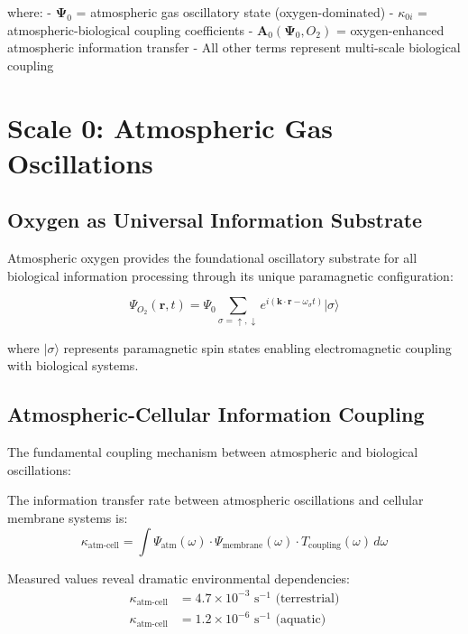 \documentclass[twocolumn]{article}
\begin{document}
where:
- $\mathbf{\Psi}_0$ = atmospheric gas oscillatory state (oxygen-dominated)
- $\kappa_{0i}$ = atmospheric-biological coupling coefficients
- $\mathbf{A}_0(\mathbf{\Psi}_0, O_2)$ = oxygen-enhanced atmospheric information transfer
- All other terms represent multi-scale biological coupling

\section{Scale 0: Atmospheric Gas Oscillations}

\subsection{Oxygen as Universal Information Substrate}

Atmospheric oxygen provides the foundational oscillatory substrate for all biological information processing through its unique paramagnetic configuration:

\begin{equation}
\Psi_{O_2}(\mathbf{r}, t) = \Psi_0 \sum_{\sigma=\uparrow,\downarrow} e^{i(\mathbf{k} \cdot \mathbf{r} - \omega_\sigma t)} |\sigma\rangle
\end{equation}

where $|\sigma\rangle$ represents paramagnetic spin states enabling electromagnetic coupling with biological systems.

\subsection{Atmospheric-Cellular Information Coupling}

The fundamental coupling mechanism between atmospheric and biological oscillations:

\begin{definition}
The information transfer rate between atmospheric oscillations and cellular membrane systems is:
\begin{equation}
\kappa_{\text{atm-cell}} = \int \Psi_{\text{atm}}(\omega) \cdot \Psi_{\text{membrane}}(\omega) \cdot T_{\text{coupling}}(\omega) \, d\omega
\end{equation}
\end{definition}

Measured values reveal dramatic environmental dependencies:
\begin{align}
\kappa_{\text{atm-cell}} &= 4.7 \times 10^{-3} \text{ s}^{-1} \text{ (terrestrial)} \\
\kappa_{\text{atm-cell}} &= 1.2 \times 10^{-6} \text{ s}^{-1} \text{ (aquatic)}
\end{align}
\end{document}

